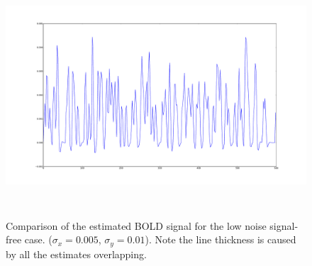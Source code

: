 \begin{figure}[H]
\centering
\includegraphics[clip=true,trim=6cm 3cm 6cm 3cm,height=9cm]{images/fits_noiseonly}
\caption[Comparison of the estimated \ac{BOLD} signal for the low noise signal-free case.
($\sigma_x = 0.005$, $\sigma_y = 0.01$)]  
{Comparison of the estimated \ac{BOLD} signal for the low noise signal-free case.
 ($\sigma_x = 0.005$, $\sigma_y = 0.01$). Note the line thickness is caused
by all the estimates overlapping.}
\label{fig:fits_noiseonly}
\end{figure}

